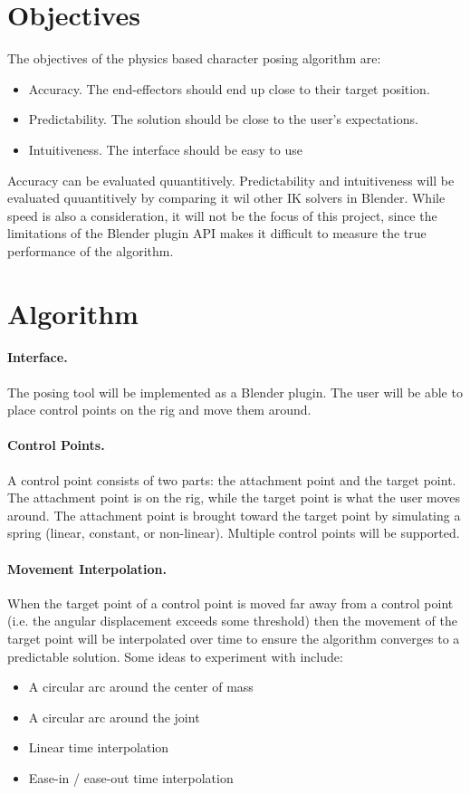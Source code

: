 \documentclass[10pt,twocolumn,letterpaper]{article}
\begin{document}
\section*{Objectives} The objectives of the physics based character posing algorithm are:
\begin{itemize}
    \item Accuracy. The end-effectors should end up close to their target position.
    \item Predictability. The solution should be close to the user's expectations.  
    \item Intuitiveness. The interface should be easy to use 
\end{itemize}

Accuracy can be evaluated quuantitively. Predictability and intuitiveness will be evaluated quuantitively by comparing it wil other IK solvers in Blender. While speed is also a consideration, it will not be the focus of this project, since the limitations of the Blender plugin API makes it difficult to measure the true performance of the algorithm.

\section*{Algorithm}

\paragraph{Interface.} The posing tool will be implemented as a Blender plugin. The user will be able to place control points on the rig and move them around. 

\paragraph{Control Points.} A control point consists of two parts: the attachment point and the target point. The attachment point is on the rig, while the target point is what the user moves around. The attachment point is brought toward the target point by simulating a spring (linear, constant, or non-linear). Multiple control points will be supported.

\paragraph{Movement Interpolation.} When the target point of a control point is moved far away from a control point (i.e. the angular displacement exceeds some threshold) then the movement of the target point will be interpolated over time to ensure the algorithm converges to a predictable solution. Some ideas to experiment with include:
\begin{itemize}
    \item A circular arc around the center of mass
    \item A circular arc around the joint
    \item Linear time interpolation
    \item Ease-in / ease-out time interpolation
\end{itemize}
\end{document}
